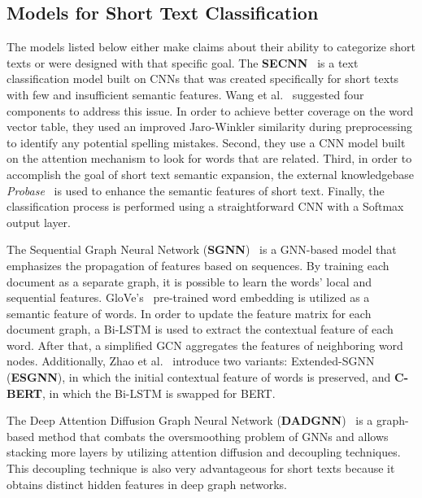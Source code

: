 \documentclass[runningheads]{llncs}
\begin{document}
\subsection{Models for Short Text Classification}
\label{sec:models_short}
The models listed below either make claims about their ability to categorize short texts or were designed with that specific goal.
The \textbf{SECNN}~\cite{wang2021short} is a text classification model built on \acp{CNN} that was created specifically for short texts with few and insufficient semantic features.
Wang et al.~\cite{wang2021short} suggested four components to address this issue. In order to achieve better coverage on the word vector table, they used an improved Jaro-Winkler similarity during preprocessing to identify any potential spelling mistakes. Second, they use a \ac{CNN} model built on the attention mechanism to look for words that are related. 
Third, in order to accomplish the goal of short text semantic expansion, the external knowledgebase \emph{Probase}~\cite{probase} is used to enhance the semantic features of short text. Finally, the classification process is performed using a straightforward \ac{CNN} with  a Softmax output layer.

The Sequential Graph Neural Network (\textbf{SGNN})~\cite{zhao2021sequential} is a \ac{GNN}-based model that emphasizes the propagation of features based on sequences. 
By training each document as a separate graph, it is possible to learn the words' local and sequential features. GloVe's~\cite{pennington2014glove} pre-trained word embedding is utilized as a semantic feature of words. In order to update the feature matrix for each document graph, a Bi-LSTM is used to extract the contextual feature of each word. After that, a simplified \ac{GCN} aggregates the features of neighboring word nodes.
Additionally, Zhao et al.~\cite{zhao2021sequential} introduce two variants: 
Extended-SGNN (\textbf{ESGNN}), in which the initial contextual feature of words is preserved, and \textbf{C-BERT}, in which the Bi-LSTM is swapped for BERT.

The Deep Attention Diffusion Graph Neural Network (\textbf{DADGNN})~\cite{liu2021deep} is a graph-based method that combats the oversmoothing problem of \acp{GNN} and allows stacking more layers by utilizing attention diffusion and decoupling techniques.
This decoupling technique is also very advantageous for short texts because it obtains distinct hidden features in deep graph networks.
\end{document}
